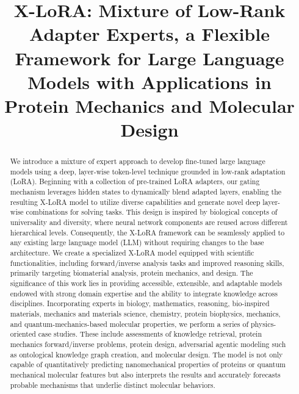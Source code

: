 \title{X-LoRA: Mixture of Low-Rank Adapter Experts, a Flexible Framework for Large Language Models with Applications in Protein Mechanics and Molecular Design}

\begin{abstract}
We introduce a mixture of expert approach to develop fine-tuned large language models using a deep, layer-wise token-level technique grounded in low-rank adaptation (LoRA). Beginning with a collection of pre-trained LoRA adapters, our gating mechanism leverages hidden states to dynamically blend adapted layers, enabling the resulting X-LoRA model to utilize diverse capabilities and generate novel deep layer-wise combinations for solving tasks. This design is inspired by biological concepts of universality and diversity, where neural network components are reused across different hierarchical levels. Consequently, the X-LoRA framework can be seamlessly applied to any existing large language model (LLM) without requiring changes to the base architecture. We create a specialized X-LoRA model equipped with scientific functionalities, including forward/inverse analysis tasks and improved reasoning skills, primarily targeting biomaterial analysis, protein mechanics, and design. The significance of this work lies in providing accessible, extensible, and adaptable models endowed with strong domain expertise and the ability to integrate knowledge across disciplines. Incorporating experts in biology, mathematics, reasoning, bio-inspired materials, mechanics and materials science, chemistry, protein biophysics, mechanics, and quantum-mechanics-based molecular properties, we perform a series of physics-oriented case studies. These include assessments of knowledge retrieval, protein mechanics forward/inverse problems, protein design, adversarial agentic modeling such as ontological knowledge graph creation, and molecular design. The model is not only capable of quantitatively predicting nanomechanical properties of proteins or quantum mechanical molecular features but also interprets the results and accurately forecasts probable mechanisms that underlie distinct molecular behaviors.
\end{abstract}

